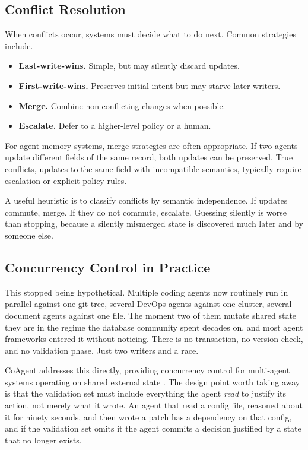 \subsection{Conflict Resolution}

When conflicts occur, systems must decide what to do next. Common strategies include.

\begin{itemize}
\item \textbf{Last-write-wins.} Simple, but may silently discard updates.
\item \textbf{First-write-wins.} Preserves initial intent but may starve later writers.
\item \textbf{Merge.} Combine non-conflicting changes when possible.
\item \textbf{Escalate.} Defer to a higher-level policy or a human.
\end{itemize}

For agent memory systems, merge strategies are often appropriate. If two agents update different fields of the same record, both updates can be preserved. True conflicts, updates to the same field with incompatible semantics, typically require escalation or explicit policy rules.

A useful heuristic is to classify conflicts by semantic independence. If updates commute, merge. If they do not commute, escalate. Guessing silently is worse than stopping, because a silently mismerged state is discovered much later and by someone else.

\subsection{Concurrency Control in Practice}

This stopped being hypothetical. Multiple coding agents now routinely run in
parallel against one git tree, several DevOps agents against one cluster, several
document agents against one file. The moment two of them mutate shared state they
are in the regime the database community spent decades on, and most agent
frameworks entered it without noticing. There is no transaction, no version check, and no validation phase. Just two writers and a race.

CoAgent addresses this directly, providing concurrency control for multi-agent
systems operating on shared external state \cite{coagent2026}. The design point
worth taking away is that the validation set must include everything the agent
\emph{read} to justify its action, not merely what it wrote. An agent that read a
config file, reasoned about it for ninety seconds, and then wrote a patch has a
dependency on that config, and if the validation set omits it the agent commits a
decision justified by a state that no longer exists.

